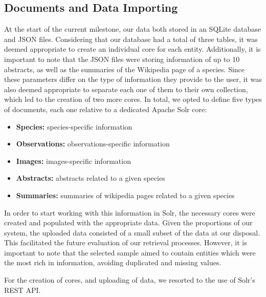 \subsection{Documents and Data Importing}

At the start of the current milestone, our data both stored in an SQLite database and JSON files. Considering that our database had a total of three tables, it was deemed appropriate to create an individual core for each entity. Additionally, it is important to note that the JSON files were storing information of up to 10 abstracts, as well as the summaries of the Wikipedia page of a species. Since these parameters differ on the type of information they provide to the user, it was also deemed appropriate to separate each one of them to their own collection, which led to the creation of two more cores. In total, we opted to define five types of documents, each one relative to a dedicated Apache Solr core:

\begin{itemize}
    \item \textbf{Species:} species-specific information
    \item \textbf{Observations:} observations-specific information
    \item \textbf{Images:} images-specific information
    \item \textbf{Abstracts:} abstracts related to a given species
    \item \textbf{Summaries:} summaries of wikipedia pages related to a given species
\end{itemize}


In order to start working with this information in Solr, the necessary cores were created and populated with the appropriate data. Given the proportions of our system, the uploaded data consisted of a small subset of the data at our disposal. This facilitated the future evaluation of our retrieval processes. However, it is important to note that the selected sample aimed to contain entities which were the most rich in information, avoiding duplicated and missing values.

For the creation of cores, and uploading of data, we resorted to the use of Solr's REST API.
